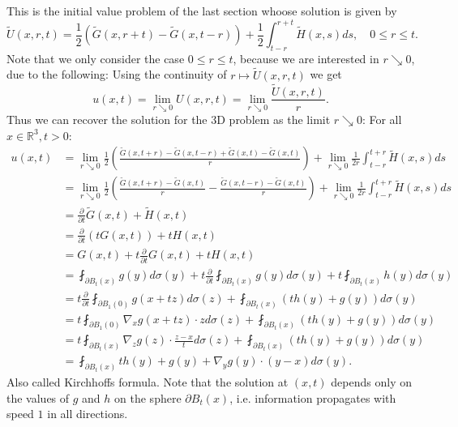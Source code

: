 \documentclass[A4,12pt,twoside]{book}
\begin{document}
This is the initial value problem of the last section whoose solution is given by 
\[
\tilde{U} (x,r,t) = \frac{1}{2} ( \tilde{G} (x,r+t) - \tilde{G} (x,t-r)) + \frac{1}{2} \int_{t-r}^{r+t} \tilde{H} (x,s) ds, \quad 0 \leq r \leq t.
\]
Note that we only consider the case $0\leq r \leq t$, because we are interested in $r \searrow 0$, due to the following: Using the continuity of $r \mapsto \tilde{U} (x,r,t)$ we get
\[
u(x,t) = \lim_{r \searrow 0} U(x,r,t) = \lim_{r \searrow 0} \frac{\tilde{U}(x,r,t)}{r}.
\]
Thus we can recover the solution for the 3D problem as the limit $r \searrow 0$: For all $x \in \mathbb{R}^3, t >0$:
\begin{align*}
    u(x,t) &= \lim_{r \searrow 0} \frac{1}{2} \left( \frac{\tilde{G}(x,t+r)- \tilde{G}(x,t-r) + \tilde{G}(x,t) - \tilde{G}(x,t)}{r} \right) + \lim_{r \searrow 0} \frac{1}{2r} \int_{t-r}^{t+r} \tilde{H} (x,s) ds\\
    &= \lim_{r \searrow 0} \frac{1}{2} \left( \frac{\tilde{G}(x,t+r) - \tilde{G}(x,t)}{r} -\frac{\tilde{G}(x,t-r)- \tilde{G}(x,t)}{r} \right) + \lim_{r \searrow 0} \frac{1}{2r} \int_{t-r}^{t+r} \tilde{H} (x,s) ds\\
    &= \frac{\partial}{\partial t} \tilde{G}(x,t) + \tilde{H}(x,t) \\
    &= \frac{\partial}{\partial t} (t G(x,t)) + t H(x,t) \\
    &= G(x,t) + t \frac{\partial}{\partial t} G(x,t) + t H(x,t) \\
    &= \fint_{\partial B_t (x)} g(y) d \sigma (y) + t \frac{\partial}{\partial t} \fint_{\partial B_t (x)} g(y) d \sigma (y) + t \fint_{\partial B_t (x)} h(y) d \sigma (y)\\
    &=  t \frac{\partial}{\partial t} \fint_{\partial B_1 (0)} g(x+tz) d \sigma (z) +  \fint_{\partial B_t (x)}(t h(y) + g(y)) d \sigma (y)\\
    &=  t  \fint_{\partial B_1 (0)} \nabla_x g(x+tz) \cdot z d \sigma (z) +  \fint_{\partial B_t (x)}(t h(y) + g(y)) d \sigma (y)\\
    &=  t  \fint_{\partial B_t (x)} \nabla_z g(z) \cdot \frac{z-x}{t} d \sigma (z) +  \fint_{\partial B_t (x)}(t h(y) + g(y)) d \sigma (y) \\
    &= \fint_{\partial B_t (x)} th(y) + g(y) + \nabla_y g(y) \cdot (y-x) d \sigma (y).
\end{align*}
Also called Kirchhoffs formula. Note that the solution at $(x,t)$ depends only on the values of $g$ and $h$ on the sphere $\partial B_t (x)$, i.e. information propagates with speed $1$ in all directions.
\end{document}
